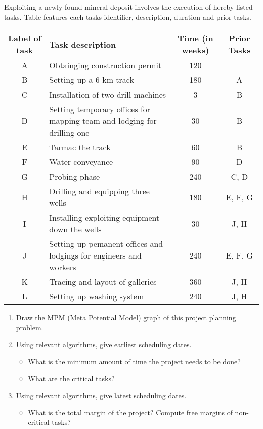 \documentclass[12pt,a4paper]{article}
\begin{document}
\begin{question}
  Exploiting a newly found mineral deposit involves the execution of
  hereby listed tasks. Table features each tasks identifier,
  description, duration and prior tasks.

    \vspace{2\baselineskip}
  \begin{center}
    \renewcommand{\arraystretch}{1.5}
    \begin{tabularx}{\textwidth}{|c|p{6.75cm}|c|c|}
      \hline
      Label of task & Task description & Time (in weeks)  & Prior Tasks\\
      \hline
      A  & Obtainging construction permit & 120 & --   \\
      \hline
      B  & Setting up a 6 km track & 180 & A  \\
      \hline
      C  & Installation of two drill machines & 3 & B  \\
      \hline
      D  & Setting temporary offices for mapping team and lodging for drilling one & 30 & B  \\
      \hline
      E  & Tarmac the track & 60 & B  \\
      \hline
      F  & Water conveyance & 90 & D  \\
      \hline
      G  & Probing phase & 240 & C, D  \\
      \hline
      H  & Drilling and equipping three wells & 180 & E, F, G  \\
      \hline
      I  & Installing exploiting equipment down the wells & 30 & J, H  \\
      \hline
      J  & Setting up pemanent offices and lodgings for engineers and workers & 240 & E, F, G  \\
      \hline
      K  & Tracing and layout of galleries & 360 & J, H  \\
      \hline
      L  & Setting up washing system & 240 & J, H  \\
      \hline
    \end{tabularx}
  \end{center}
  \vspace{\baselineskip}
  \begin{enumerate}
  \item Draw the MPM (Meta Potential Model) graph of this project
    planning problem.
  \item Using relevant algorithms, give earliest scheduling dates.
    \begin{itemize}
    \item What is the minimum amount of time the project needs to be done?
    \item What are the critical tasks?
    \end{itemize}
  \item Using relevant algorithms, give latest scheduling dates.
    \begin{itemize}
    \item What is the total margin of the project? Compute free
      margins of non-critical tasks?
    \end{itemize}
  \end{enumerate}
\end{question}
\end{document}
